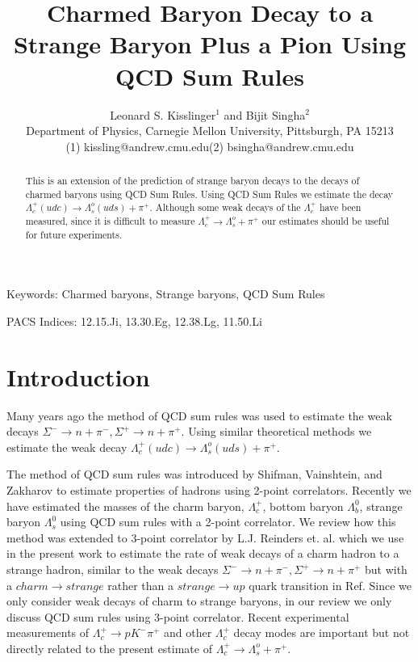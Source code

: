 \documentclass[twoside]{article}
\begin{document}
\title{Charmed Baryon Decay to a Strange Baryon Plus a Pion Using QCD  
Sum Rules}
\author{Leonard S. Kisslinger$^{1}$ and Bijit Singha$^{2}$\\
Department of Physics, Carnegie Mellon University, Pittsburgh, PA 15213\\
\hspace{1cm}(1) kissling@andrew.cmu.edu\hspace{1cm}(2) bsingha@andrew.cmu.edu}
\date{}
\maketitle
\begin{abstract}

This is an extension of the prediction of strange baryon decays to the
decays of charmed baryons using QCD Sum Rules. Using QCD Sum Rules we
estimate the decay $\Lambda^+_c (udc) \rightarrow \Lambda^o_s(uds)+ \pi^+$.
Although some weak decays of the $\Lambda^+_c$ have been measured, since it is 
difficult to measure $\Lambda^+_c \rightarrow \Lambda^o_s+ \pi^+$ our 
estimates should be useful for future experiments.

\end{abstract}

\noindent
Keywords: Charmed baryons, Strange baryons, QCD Sum Rules

\noindent
PACS Indices: 12.15.Ji, 13.30.Eg, 12.38.Lg, 11.50.Li

\section{Introduction}

Many years ago the method of QCD sum rules was used\cite{hhk02}
to estimate the weak decays $\Sigma^- \rightarrow n+\pi^-, \Sigma^+ 
\rightarrow  n+\pi^+$. Using similar theoretical methods we estimate the weak
 decay  $\Lambda^+_c (udc) \rightarrow \Lambda^o_s(uds) + \pi^+$.

  The method of QCD sum rules was introduced by Shifman, Vainshtein, and 
Zakharov \cite{SVZ} to estimate properties of hadrons using 2-point 
correlators.
Recently we have estimated the masses of the charm baryon, $\Lambda^+_c$, 
bottom baryon $\Lambda^0_b$, strange baryon $\Lambda^0_s$ using QCD sum rules 
with a 2-point correlator\cite{kb17}.
We review how this method was extended to 3-point correlator by L.J. Reinders 
et. al.\cite{RRY85} which we use in the present work to estimate the rate of 
weak decays of a charm hadron to a strange hadron, similar to the weak decays
$\Sigma^- \rightarrow n+\pi^-, \Sigma^+ \rightarrow  n+\pi^+$ but with a
$charm \rightarrow strange$ rather than a $strange \rightarrow up$ quark
transition in Ref\cite{hhk02}. Since we only consider weak decays of charm to 
strange baryons, in our review we only discuss QCD sum rules using 3-point 
correlator. Recent experimental measurements of $\Lambda^+_c \rightarrow pK^- 
\pi^+$ and other $\Lambda^+_c$ decay modes\cite{BESIII16} are important but not
 directly related to the present estimate of $\Lambda^+_c \rightarrow 
\Lambda^o_s+ \pi^+$.
\end{document}
